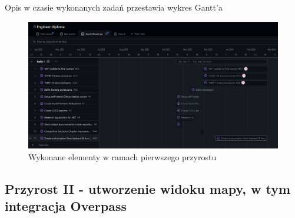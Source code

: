 Opis w czasie wykonanych zadań przestawia wykres Gantt'a
\begin{figure}[H]
    \centering
    \includegraphics[width=1\textwidth]{attachments/RALLY1}
    \caption{Wykonane elementy w ramach pierwszego przyrostu}
    \label{fig:figure3}
    \end{figure}

    \subsection{Przyrost II - utworzenie widoku mapy, w tym integracja  Overpass}
    \label{sec:przyrost2}

